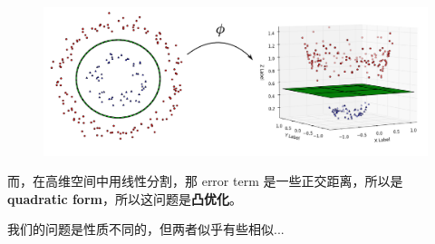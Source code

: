\documentclass[12pt]{article}
\begin{document}
\begin{figure}[H]
\centering
\includegraphics[scale=0.6]{kernel-trick.png}
\end{figure}

而，在高维空间中用线性分割，那 error term 是一些正交距离，所以是 \textbf{quadratic form}，所以这问题是\textbf{凸优化}。


我们的问题是性质不同的，但两者似乎有些相似... 
\end{document}
